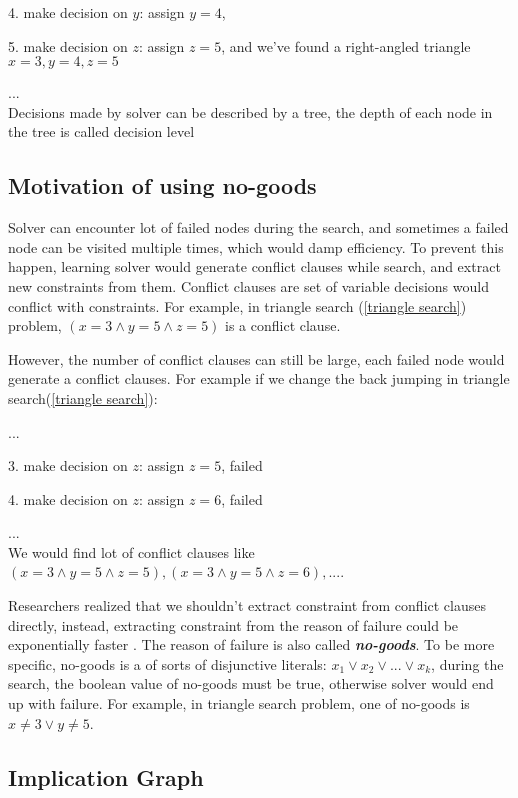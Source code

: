 \documentclass{article}
\begin{document}
4. make decision on $y$: assign $y=4$,

5. make decision on $z$: assign $z=5$, and we've found a right-angled triangle $x=3, y=4, z=5$

...\\
Decisions made by solver can be described by a tree, the depth of each node in the tree is called decision level


\subsection{Motivation of using no-goods}

Solver can encounter lot of failed nodes during the search, and sometimes a failed node can be visited multiple times, which would damp efficiency. To prevent this happen, learning solver would generate conflict clauses while search, and extract new constraints from them. Conflict clauses\cite{tichy2006clause} are set of variable decisions would conflict with constraints. For example, in triangle search (\ref{triangle search}) problem, $(x=3 \land y=5 \land z=5)$ is a conflict clause.

However, the number of conflict clauses can still be large, each failed node would generate a conflict clauses. For example if we change the back jumping in triangle search(\ref{triangle search}):

...

3. make decision on $z$: assign $z=5$, failed

4. make decision on $z$: assign $z=6$, failed

...\\
We would find lot of conflict clauses like $(x=3 \land y=5 \land z=5), (x=3 \land y=5 \land z=6),...$.

Researchers realized that we shouldn't extract constraint from conflict clauses directly, instead, extracting constraint from the reason of failure could be exponentially faster \cite{beame2003understanding}. The reason of failure is also called \textbf{\textit{no-goods}}. To be more specific, no-goods is a of sorts of disjunctive literals: $x_1 \lor x_2 \lor ... \lor x_k$, during the search, the boolean value of no-goods must be true, otherwise solver would end up with failure. For example, in triangle search problem, one of no-goods is $x \neq 3 \lor y \neq 5$.

\subsection{Implication Graph}
\end{document}
